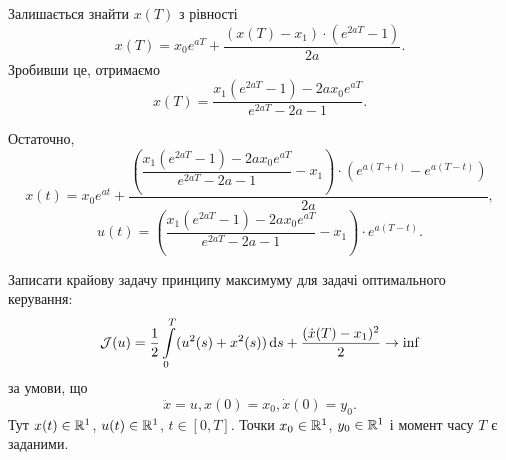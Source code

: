 \begin{solution}

	Залишається знайти $x(T)$ з рівності 
	\begin{equation}
		x(T) = x_0 e^{a T} + \dfrac{(x(T) - x_1) \cdot (e^{2 a T} - 1)}{2 a}.
	\end{equation}
	Зробивши це, отримаємо
	\begin{equation}
		x(T) = \dfrac{x_1 (e^{2 a T} - 1) - 2 a x_0 e^{a T}}{e^{2 a T} - 2 a - 1}.
	\end{equation}

	Остаточно,
	\begin{equation}
		x(t) = x_0 e^{a t} + \dfrac{\left(\dfrac{x_1 (e^{2 a T} - 1) - 2 a x_0 e^{a T}}{e^{2 a T} - 2 a - 1} - x_1\right) \cdot \left(e^{a (T + t)} - e^{a (T - t)}\right)}{2 a},
	\end{equation}	
	\begin{equation}
		u(t) = \left(\dfrac{x_1 (e^{2 a T} - 1) - 2 a x_0 e^{a T}}{e^{2 a T} - 2 a - 1} - x_1\right) \cdot e^{a (T - t)}.
	\end{equation}
\end{solution}

\begin{problem}
    Записати крайову задачу принципу максимуму для задачі оптимального керування:
    \begin{equation*}
        \mathcal{J}(u) = \dfrac12 \displaystyle\int\limits_0^T (u^2(s) + x^2(s)) \, \mathrm{d} s + \dfrac{(\dot x(T) - x_1)^2}{2} \to \inf
    \end{equation*}
    за умови, що
    \begin{equation*}
        \ddot x = u, x(0) = x_0, \dot x(0) = y_0.
    \end{equation*}
    Тут $x(t) \in \mathbb{R}^1$, $u(t) \in \mathbb{R}^1$, $t \in [0, T]$. Точки $x_0 \in \mathbb{R}^1$, $y_0 \in \mathbb{R}^1$ і момент часу $T$ є заданими.
\end{problem}

